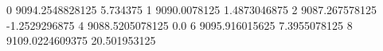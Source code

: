 0 9094.2548828125 5.734375
1 9090.0078125 1.4873046875
2 9087.267578125 -1.2529296875
4 9088.5205078125 0.0
6 9095.916015625 7.3955078125
8 9109.0224609375 20.501953125
